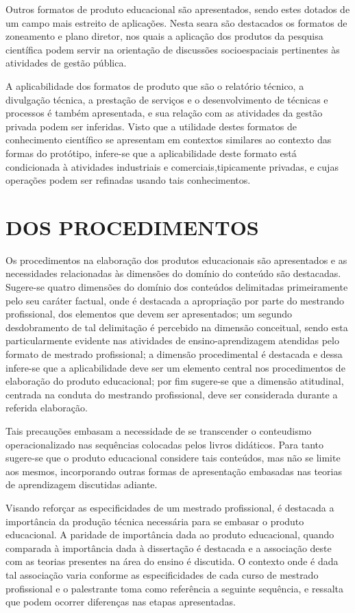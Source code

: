 \documentclass[
   article,       %
   12pt,          %
   oneside,       %
   a4paper,       %
   english,       %
   brazil,           %
   sumario=tradicional
   ]{abntex2}
\begin{document}
Outros formatos de produto educacional são apresentados, sendo estes dotados de um campo mais estreito de aplicações. Nesta seara são destacados os formatos de zoneamento e plano diretor, nos quais a aplicação dos produtos da pesquisa científica podem servir na orientação de discussões socioespaciais pertinentes às atividades de gestão pública.

A aplicabilidade dos formatos de produto que são o relatório técnico, a divulgação técnica, a prestação de serviços e o desenvolvimento de técnicas e processos é também apresentada, e sua relação com as atividades da gestão privada podem ser inferidas. Visto que a utilidade destes formatos de conhecimento científico se apresentam em contextos similares ao contexto das formas do protótipo, infere-se que a aplicabilidade deste formato está condicionada à atividades industriais e comerciais,tipicamente privadas, e cujas operações podem ser refinadas usando tais conhecimentos.


\section{DOS PROCEDIMENTOS}

Os procedimentos na elaboração dos produtos educacionais são apresentados e as necessidades relacionadas às dimensões do domínio do conteúdo são destacadas. Sugere-se quatro dimensões do domínio dos conteúdos delimitadas primeiramente pelo seu caráter factual, onde é destacada a apropriação por parte do mestrando profissional, dos elementos que devem ser apresentados; um segundo desdobramento de tal delimitação é percebido na dimensão conceitual, sendo esta particularmente evidente nas atividades de ensino-aprendizagem atendidas pelo formato de mestrado profissional; a dimensão procedimental é destacada e dessa infere-se que a aplicabilidade deve ser um elemento central nos procedimentos de elaboração do produto educacional; por fim sugere-se que a dimensão atitudinal, centrada na conduta do mestrando profissional, deve ser considerada durante a referida elaboração.

Tais precauções embasam a necessidade de se transcender o conteudismo operacionalizado nas sequências colocadas pelos livros didáticos. Para tanto sugere-se que o produto educacional considere tais conteúdos, mas não se limite aos mesmos, incorporando outras formas de apresentação embasadas nas teorias de aprendizagem discutidas adiante.

Visando reforçar as especificidades de um mestrado profissional, é destacada a importância da produção técnica necessária para se embasar o produto educacional. A paridade de importância dada ao produto educacional, quando comparada à importância dada à dissertação é destacada e a associação deste com as teorias presentes na área do ensino é discutida. O contexto onde é dada tal associação varia conforme as especificidades de cada curso de mestrado profissional e o palestrante toma como referência a seguinte sequência, e ressalta que podem ocorrer diferenças nas etapas apresentadas.
\end{document}
